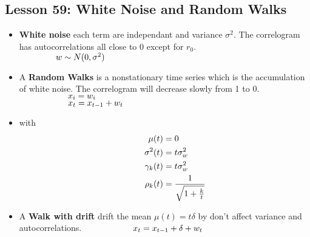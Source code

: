 \documentclass[10pt, french]{article}
\begin{document}
\begin{multicols*}{3}
\section*{Lesson 59: White Noise and Random Walks}
\begin{itemize}[align=left,leftmargin=*]
   \item \textbf{White noise} each term are independant and variance $\sigma^2$. The correlogram has autocorrelations all close to 0 except for $r_0$. \\
   $\hspace*{1.5cm} w \sim N(0,\sigma^2) $
   \item A \textbf{Random Walks} is a nonstationary time series which is the accumulation of white noise. The correlogram will decrease slowly from 1 to 0.
   $\hspace*{2cm}x_i = w_i$ \\
   $\hspace*{2cm}x_t = x_{t-1} + w_t$
   \item[] with
   \begin{align*}
        \hspace*{1cm}
      \mu(t) &= 0 \\
      \sigma^2(t) &= t\sigma_w^2 \\
      \gamma_k(t) &= t\sigma_w^2 \\
      \rho_k(t) &= \frac{1}{\sqrt{1 + \frac{k}{t}}}
   \end{align*}
   \item A \textbf{Walk with drift} drift the mean $\mu(t) = t\delta$ by don't affect variance and autocorrelations.
   $\hspace*{2cm} x_t = x_{t-1} + \delta + w_t$
\end{itemize}


\end{multicols*}
\end{document}
